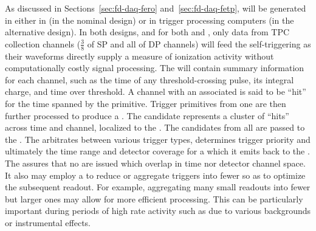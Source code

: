 As discussed in Sections~\ref{sec:fd-daq-fero}
and~\ref{sec:fd-daq-fetp},  will be generated in
either in  (in the nominal design) or in trigger
processing computers (in the alternative design). 
In both designs, and for both  and 
, only data from TPC collection channels ($\frac{3}{8}$ of SP and all of DP channels) will feed
the self-triggering as their waveforms directly supply a measure of
ionization activity without computationally costly signal processing.
The  will contain summary information for each
channel, such as the time of any threshold-crossing pulse, its
integral charge, and time over threshold. 
A channel with an associated  is said to be
``hit'' for the time spanned by the primitive. 
Trigger primitives from one  are then further processed
to produce a . 
The candidate represents a cluster of ``hits'' across time and
channel, localized to the .
The candidates from all  are passed to the
.
The  arbitrates between various trigger types, determines
trigger priority and ultimately the time range and detector coverage
for a  which it emits back to the .
The  assures that no  are issued which
overlap in time nor detector channel space.
It also may employ a  to reduce or aggregate triggers into
fewer  so as to optimize the subsequent readout. 
For example, aggregating many small readouts into fewer but larger
ones may allow for more efficient processing.   This can be particularly
important during periods of high rate activity such as due to various
backgrounds or instrumental effects.

